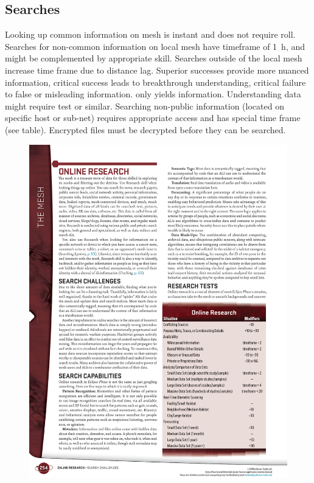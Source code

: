 \subsection*{Searches}

\begin{itemize}
   \itembox Looking up common information on mesh is instant and does not require roll.
   \itembox Searches for non-common information on local mesh have timeframe of \SI{1}{h}, and might be complemented by appropriate  skill. Searches outside of the local mesh increase time frame due to distance lag.
   \itembox Superior successes provide more nuanced information, critical success leads to breakthrough understanding, critical failure to false or misleading information.
   \itembox {} only yields information. Understanding data might require  test or similar.
   \itembox Searching non-public information (located on specific host or sub-net) requires appropriate access and has special time frame (see table). Encrypted files must be decrypted before they can be searched.
\end{itemize}


\begin{figure}[htbp!]%
   \includegraphics[scale=0.9]{gfx/mesh-research}%
\end{figure}%

